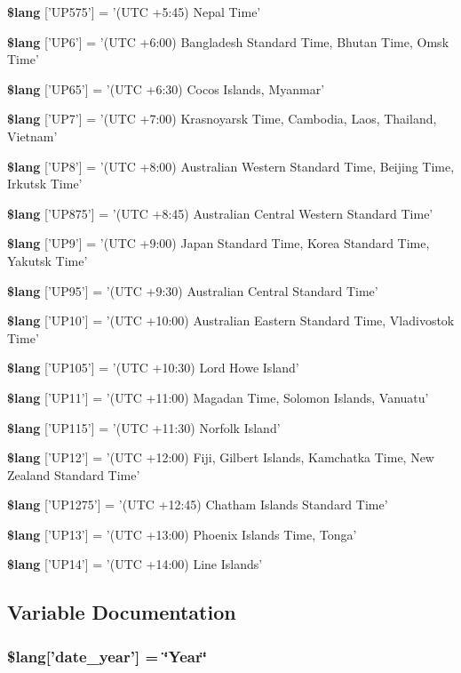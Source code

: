 \begin{DoxyCompactItemize}
{\bf \$lang} ['U\-P575'] = '(U\-T\-C +5\-:45) Nepal Time'
\item 
{\bf \$lang} ['U\-P6'] = '(U\-T\-C +6\-:00) Bangladesh Standard Time, Bhutan Time, Omsk Time'
\item 
{\bf \$lang} ['U\-P65'] = '(U\-T\-C +6\-:30) Cocos Islands, Myanmar'
\item 
{\bf \$lang} ['U\-P7'] = '(U\-T\-C +7\-:00) Krasnoyarsk Time, Cambodia, Laos, Thailand, Vietnam'
\item 
{\bf \$lang} ['U\-P8'] = '(U\-T\-C +8\-:00) Australian Western Standard Time, Beijing Time, Irkutsk Time'
\item 
{\bf \$lang} ['U\-P875'] = '(U\-T\-C +8\-:45) Australian Central Western Standard Time'
\item 
{\bf \$lang} ['U\-P9'] = '(U\-T\-C +9\-:00) Japan Standard Time, Korea Standard Time, Yakutsk Time'
\item 
{\bf \$lang} ['U\-P95'] = '(U\-T\-C +9\-:30) Australian Central Standard Time'
\item 
{\bf \$lang} ['U\-P10'] = '(U\-T\-C +10\-:00) Australian Eastern Standard Time, Vladivostok Time'
\item 
{\bf \$lang} ['U\-P105'] = '(U\-T\-C +10\-:30) Lord Howe Island'
\item 
{\bf \$lang} ['U\-P11'] = '(U\-T\-C +11\-:00) Magadan Time, Solomon Islands, Vanuatu'
\item 
{\bf \$lang} ['U\-P115'] = '(U\-T\-C +11\-:30) Norfolk Island'
\item 
{\bf \$lang} ['U\-P12'] = '(U\-T\-C +12\-:00) Fiji, Gilbert Islands, Kamchatka Time, New Zealand Standard Time'
\item 
{\bf \$lang} ['U\-P1275'] = '(U\-T\-C +12\-:45) Chatham Islands Standard Time'
\item 
{\bf \$lang} ['U\-P13'] = '(U\-T\-C +13\-:00) Phoenix Islands Time, Tonga'
\item 
{\bf \$lang} ['U\-P14'] = '(U\-T\-C +14\-:00) Line Islands'
\end{DoxyCompactItemize}


\subsection{Variable Documentation}
\subsubsection[{\$lang}]{\setlength{\rightskip}{0pt plus 5cm}\$lang['date\-\_\-year'] = \char`\"{}Year\char`\"{}}\label{date__lang_8php_ad344b819f5b881c0e2d75c994b8781b7}


